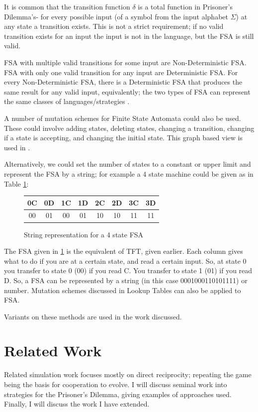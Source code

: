 \documentclass[a4paper,11pt,bcshonoursthesis,singlespace,twoside,thesisdraft,pdflatex]{cssethesis}
\renewcommand{\cite}{\citep} %
\begin{document}
It is common that the transition function $\delta$ is a total function in Prisoner's Dilemma's- for every possible input (of a symbol from the input alphabet $\Sigma$) at any state a transition exists. 
This is not a strict requirement; if no valid transition exists for an input the input is not in the language, but the FSA is still valid. 

FSA with multiple valid transitions for some input are Non-Deterministic FSA. 
FSA with only one valid transition for any input are Deterministic FSA. 
For every Non-Deterministic FSA, there is a Deterministic FSA that produces the same result for any valid input, equivalently; the two types of FSA can represent the same classes of languages/strategies \cite{Sipser2006chap1}. 

A number of mutation schemes for Finite State Automata could also be used. 
These could involve adding states, deleting states, changing a transition, changing if a state is accepting, and changing the initial state. 
This graph based view is used in \cite{van-veelen:PNAS:2012}. 

Alternatively, we could set the number of states to a constant or upper limit and represent the FSA by a string; for example a 4 state machine could be given as in Table \ref{table:fsa4state}:
\begin{figure}[h]
\centering
\label{table:fsa4state}
\begin{tabular}{|c|c|c|c|c|c|c|c|}
\hline
0C & 0D & 1C&1D&2C&2D&3C&3D\\
\hline
00 & 01 & 00&01&10&10&11&11\\
\hline
\end{tabular}\hfill
\caption{String representation for a 4 state FSA}
\end{figure}
The FSA given in \ref{table:fsa4state} is the equivalent of TFT, given earlier. 
Each column gives what to do if you are at a certain state, and read a certain input. 
So, at state 0 you transfer to state 0 (00) if you read C. 
You transfer to state 1 (01) if you read D. 
So, a FSA can be represented by a string (in this case 0001000110101111) or number. 
Mutation schemes discussed in Lookup Tables can also be applied to FSA. 

Variants on these methods are used in the work discussed.
\section{Related Work}
\label{sec:relatedWork}
Related simulation work focuses mostly on direct reciprocity; repeating the game being the basis for cooperation to evolve. 
I will discuss seminal work into strategies for the Prisoner's Dilemma, giving examples of approaches used. Finally, I will discuss the work I have extended.
\end{document}
